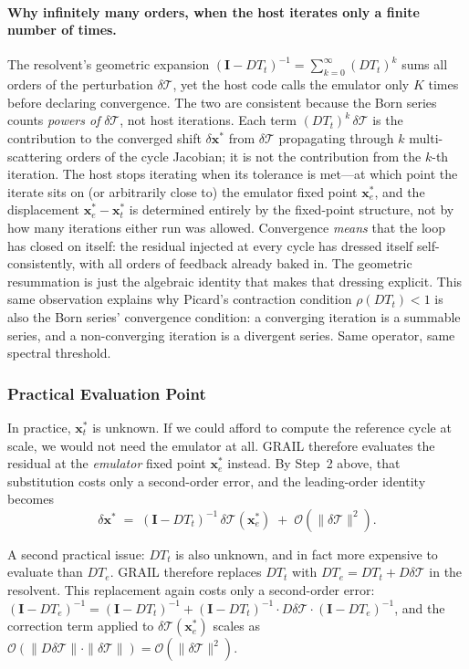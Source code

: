 \documentclass[11pt]{article}
\newcommand{\Tcyc}{\mathcal{T}}
\newcommand{\dT}{\delta\Tcyc}
\begin{document}
\paragraph{Why infinitely many orders, when the host iterates only a
finite number of times.}  The resolvent's geometric expansion
$(\mathbf{I} - DT_t)^{-1} = \sum_{k=0}^{\infty}(DT_t)^k$ sums all
orders of the perturbation $\dT$, yet the host code calls the
emulator only $K$ times before declaring convergence.  The two are
consistent because the Born series counts \emph{powers of} $\dT$, not
host iterations.  Each term $(DT_t)^k\,\dT$ is the contribution to
the converged shift $\delta\mathbf{x}^{*}$ from $\dT$ propagating
through $k$ multi-scattering orders of the cycle Jacobian; it is not
the contribution from the $k$-th iteration.  The host stops iterating
when its tolerance is met---at which point the iterate sits on (or
arbitrarily close to) the emulator fixed point $\mathbf{x}_e^*$, and
the displacement $\mathbf{x}_e^* - \mathbf{x}_t^*$ is determined
entirely by the fixed-point structure, not by how many iterations
either run was allowed.  Convergence \emph{means} that the loop has
closed on itself: the residual injected at every cycle has dressed
itself self-consistently, with all orders of feedback already baked
in.  The geometric resummation is just the algebraic identity that
makes that dressing explicit.  This same observation explains why
Picard's contraction condition $\rho(DT_t)<1$ is also the Born
series' convergence condition: a converging iteration is a summable
series, and a non-converging iteration is a divergent series.  Same
operator, same spectral threshold.

\subsubsection{Practical Evaluation Point}

In practice, $\mathbf{x}_t^*$ is unknown.  If we could afford to
compute the reference cycle at scale, we would not need the emulator at
all.  GRAIL therefore evaluates the residual at the \emph{emulator}
fixed point $\mathbf{x}_e^*$ instead.  By Step~2 above, that
substitution costs only a second-order error, and the leading-order
identity becomes
\begin{equation}
\delta\mathbf{x}^{*}
\;=\; (\mathbf{I} - DT_t)^{-1}\, \dT(\mathbf{x}_e^*)
\;+\; \mathcal{O}\!\left(\|\dT\|^2\right) .
\label{eq:resolvent-at-xe}
\end{equation}

A second practical issue: $DT_t$ is also unknown, and in fact more
expensive to evaluate than $DT_e$.  GRAIL therefore replaces $DT_t$
with $DT_e = DT_t + D\dT$ in the resolvent.  This replacement again
costs only a second-order error: $(\mathbf{I} - DT_e)^{-1} =
(\mathbf{I} - DT_t)^{-1} + (\mathbf{I} - DT_t)^{-1} \cdot D\dT \cdot
(\mathbf{I} - DT_e)^{-1}$, and the correction term applied to
$\dT(\mathbf{x}_e^*)$ scales as $\mathcal{O}(\|D\dT\| \cdot \|\dT\|)
= \mathcal{O}(\|\dT\|^2)$.
\end{document}
